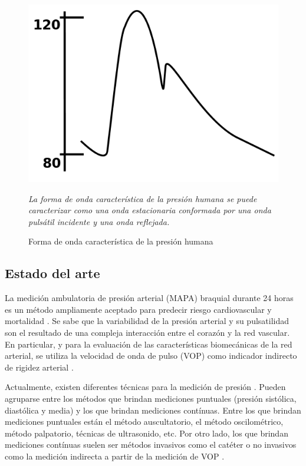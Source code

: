 \begin{figure}[!htbp]
	\centering
	\begin{minipage}{0.65\textwidth}
		\includegraphics[width=\textwidth]{./Figures/periodopresion.png}
	{\footnotesize \textit{	La forma de onda característica de la presión humana se puede caracterizar como una onda estacionaria conformada por una onda pulsátil incidente y una onda reflejada.}\par}		
	\end{minipage}
	
	\caption{Forma de onda característica de la presión humana}
	\label{fig:periodopresion}
\end{figure}


\subsection{Estado del arte}

La medición ambulatoria de presión arterial (MAPA) braquial durante 24 horas es un método ampliamente aceptado para predecir riesgo cardiovascular y mortalidad\citep{hansen2006} \citep{staensen1999} \citep{verdecchia1993}. Se sabe que la variabilidad de la presión arterial y su pulsatilidad son el resultado de una compleja interacción entre el corazón y la red vascular. En particular, y para la evaluación de las características biomecánicas de la red arterial, se utiliza la velocidad de onda de pulso (VOP) como indicador indirecto de rigidez arterial \citep{nichols2008}.

Actualmente, existen diferentes técnicas para la medición de presión \citep{ogedegbe2010}. Pueden agruparse entre los métodos que brindan mediciones puntuales (presión sistólica, diastólica y media) y los que brindan mediciones contínuas. Entre los que brindan mediciones puntuales están el método auscultatorio, el método oscilométrico, método palpatorio, técnicas de ultrasonido, etc. Por otro lado, los que brindan mediciones contínuas suelen ser métodos invasivos como el catéter o no invasivos como la medición indirecta a partir de la medición de VOP \citep{ruso2001}.

